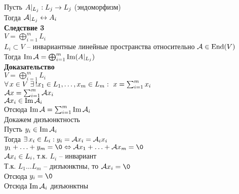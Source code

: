\documentclass[12pt]{article}
\begin{document}
Пусть $A|_{L_j}: L_j \rightarrow L_j$ (эндоморфизм)\\
Тогда $\mathcal{A}|_{L_j} \leftrightarrow A_i$\\
\textbf{Следствие 3}\\
$V = \bigoplus_{i=1}^m L_i$\\
$L_i \subset V$ -- инвариантные линейные пространства относительно $\mathcal{A} \in \operatorname{End}(V)$\\
Тогда $\operatorname{Im} \mathcal{A} = \bigoplus_{i=1}^m \operatorname{Im} (A|_{L_j})$\\
\textbf{Доказательство}\\
$V = \bigoplus_{i=1}^m L_i$\\
$\forall\, x\in V\ \exists\,! x_1 \in L_1,\ldots,x_m \in L_m:\ x=\sum_{i=1}^m x_i$\\
$\mathcal{A} x = \sum_{i=1}^m \mathcal{A} x_i$\\
$\mathcal{A} x_i \in \operatorname{Im} \mathcal{A}_i$\\
Отсюда $\operatorname{Im} \mathcal{A} = \sum_{i=1}^m \operatorname{Im} \mathcal{A}_i$\\
Докажем дизъюнктность\\
Пусть $y_i \in \operatorname{Im} \mathcal{A}_i$\\
Тогда $\exists\, x_i \in L_i: y_i = \mathcal{A} x_i = \mathcal{A}_i x_i$\\
$y_1+\ldots+y_m = \0 \LRto \mcA x_1 + \ldots + \mcA x_m = \0$\\
$\mathcal{A} x_i \in L_i$, т.к. $L_i$ -- инвариант\\
Т.к. $L_1\ldots L_m$ -- дизъюнктны, то $\mcA x_i = \0$\\
Отсюда $y_i = \0$\\
Отсюда $\operatorname{Im} \mathcal{A}_i$ дизъюнктны
\end{document}
